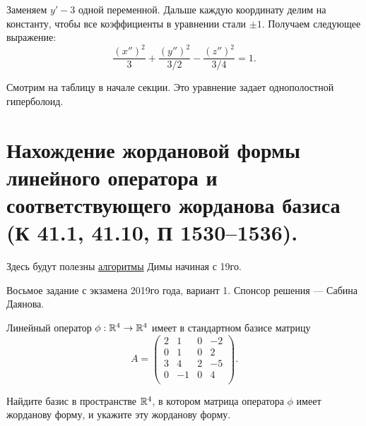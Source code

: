 \documentclass[a4paper]{article}
\begin{document}
\begin{solution}
        Заменяем $y' - 3$ одной переменной. Дальше каждую координату делим на константу, чтобы все коэффициенты в уравнении стали $\pm 1$. Получаем следующее выражение:
        \begin{equation*}
            \dfrac{(x'')^2}{3} + \dfrac{(y'')^2}{3/2} - \dfrac{(z'')^2}{3/4} = 1.
        \end{equation*}

        Смотрим на таблицу в начале секции. Это уравнение задает однополостной гиперболоид.
    \end{solution}

    \newpage
    \section{Нахождение жордановой формы линейного оператора и соответствующего жорданова базиса (К 41.1, 41.10, П 1530–1536).}

    Здесь будут полезны \href{https://docviewer.yandex.ru/view/286099993/?page=6&*=jIcVsIVsH1RJQlAqGKv0ADy944t7InVybCI6InlhLWRpc2stcHVibGljOi8vNi9YWE5ad2NSd3pjcnh0WVJ5NXBhWHIyOXJuNkhDV3dMUWdDY2RHYW5Qb2t0RDEvM0hvT1ZTRDFOV2cvVHVPbnEvSjZicG1SeU9Kb25UM1ZvWG5EYWc9PTovYWxnb3JpdGhtcy5wZGYiLCJ0aXRsZSI6ImFsZ29yaXRobXMucGRmIiwibm9pZnJhbWUiOmZhbHNlLCJ1aWQiOiIyODYwOTk5OTMiLCJ0cyI6MTU5MTk2ODE4NjIyMiwieXUiOiI1NDI5NTAxMzQxNTY1NTI2MzYyIn0%3D}{алгоритмы} Димы начиная с 19го.


    Восьмое задание с экзамена 2019го года, вариант 1. Спонсор решения --- Сабина Даянова.

    Линейный оператор $\phi: \mathbb{R}^4 \to \mathbb{R}^4$ имеет в стандартном базисе матрицу
    \begin{equation*}
        A = \begin{pmatrix}
            2 & 1 & 0 & -2 \\
            0 & 1 & 0 & 2 \\
            3 & 4 & 2 & -5 \\
            0 & -1 & 0 & 4 \\
        \end{pmatrix}.
    \end{equation*}

    Найдите базис в пространстве $\mathbb{R}^4$, в котором матрица оператора $\phi$ имеет жорданову форму, и укажите эту жорданову форму.
\end{document}

